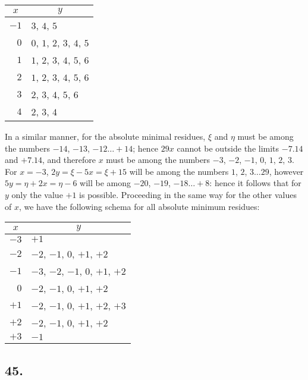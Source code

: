 \documentclass[twoside,12pt]{memoir}
\begin{document}
\begin{center}
\begin{tabular}{r|l}
\multicolumn{1}{c|}{\(x\)} & \multicolumn{1}{c}{\(y\)} \\
\hline
\(-1\) & \(3\), \(4\), \(5\) \\
\(0\) & \(0\), \(1\), \(2\), \(3\), \(4\), \(5\) \\
\(1\) & \(1\), \(2\), \(3\), \(4\), \(5\), \(6\) \\
\(2\) & \(1\), \(2\), \(3\), \(4\), \(5\), \(6\) \\
\(3\) & \(2\), \(3\), \(4\), \(5\), \(6\) \\
\(4\) & \(2\), \(3\), \(4\) \\
\end{tabular}
\end{center}
%

In a similar manner, for the absolute minimal residues, \(\xi\) and \(\eta\) must be among the numbers \(-14\), \(-13\), \(-12 \ldots+14\); hence \(29 x\) cannot be outside the limits \(-7.14\) and \(+7.14\), and therefore \(x\) must be among the numbers \(-3\), \(-2\), \(-1\), \(0\), \(1\), \(2\), \(3\). For \(x=-3\), \(2 y=\xi-5 x=\xi+15\) will be among the numbers \(1\), \(2\), \(3 \ldots 29\), however \(5 y=\eta+2 x=\eta-6\) will be among \(-20\), \(-19\), \(-18 \ldots+8\): hence it follows that for \(y\) only the value \(+1\) is possible. Proceeding in the same way for the other values of \(x\), we have the following schema for all absolute minimum residues:
\begin{center}
\begin{tabular}{r|l}
\multicolumn{1}{c|}{\(x\)} & \multicolumn{1}{c}{\(y\)} \\
\hline
\(-3\) & \(+1\) \\
\(-2\) & \(-2\), \(-1\), \(0\), \(+1\), \(+2\) \\
\(-1\) & \(-3\), \(-2\), \(-1\), \(0\), \(+1\), \(+2\) \\
\(0\) & \(-2\), \(-1\), \(0\), \(+1\), \(+2\) \\
\(+1\) & \(-2\), \(-1\), \(0\), \(+1\), \(+2\), \(+3\) \\
\(+2\) & \(-2\), \(-1\), \(0\), \(+1\), \(+2\) \\
\(+3\) & \(-1\) \\
\end{tabular}
\end{center}
%

\subsection*{45.}
\end{document}
